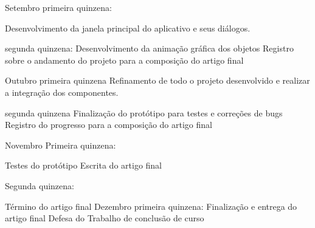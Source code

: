 Setembro
primeira quinzena:

Desenvolvimento da janela principal do aplicativo e seus diálogos.

segunda quinzena:
Desenvolvimento da animação gráfica dos objetos
Registro sobre o andamento do projeto para a composição do artigo final

Outubro
primeira quinzena
Refinamento de todo o projeto desenvolvido e realizar a integração dos componentes.

segunda quinzena
Finalização do protótipo para testes e correções de bugs
Registro do progresso para a composição do artigo final

Novembro
Primeira quinzena:

Testes do protótipo
Escrita do artigo final

Segunda quinzena:

Término do artigo final
Dezembro
primeira quinzena:
Finalização e entrega do artigo final
Defesa do Trabalho de conclusão de curso



